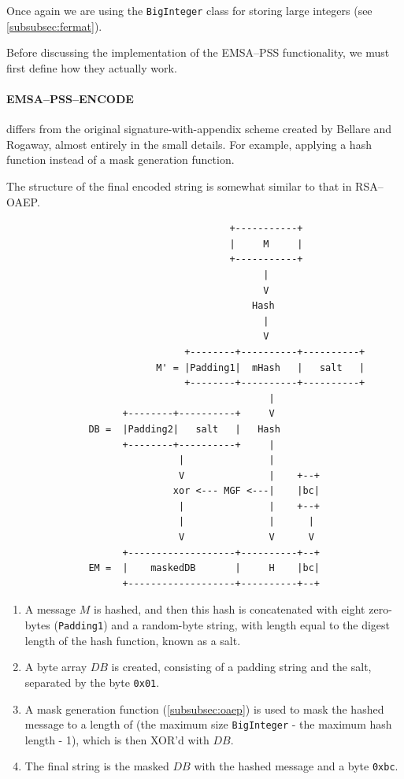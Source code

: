     Once again we are using the \verb!BigInteger! class for storing large integers (see \textsection\ref{subsubsec:fermat}).
    
    Before discussing the implementation of the EMSA--PSS functionality, we must first define how they actually work.
    
    \paragraph{EMSA--PSS--ENCODE} differs from the original signature-with-appendix scheme created by Bellare and Rogaway, almost entirely in the small details. For example, applying a hash function instead of a mask generation function. 
    
    The structure of the final encoded string is somewhat similar to that in RSA--OAEP. \\
    
    \begin{figure}
\begin{lstlisting}
                                  +-----------+
                                  |     M     |
                                  +-----------+
                                        |
                                        V
                                      Hash
                                        |
                                        V
                          +--------+----------+----------+
                     M' = |Padding1|  mHash   |   salt   |
                          +--------+----------+----------+
                                         |
               +--------+----------+     V
         DB =  |Padding2|   salt   |   Hash
               +--------+----------+     |
                         |               |
                         V               |    +--+
                        xor <--- MGF <---|    |bc|
                         |               |    +--+
                         |               |      |
                         V               V      V
               +-------------------+----------+--+
         EM =  |    maskedDB       |     H    |bc|
               +-------------------+----------+--+
\end{lstlisting}
    \end{figure}

    \begin{enumerate}
      \item A message $M$ is hashed, and then this hash is concatenated with eight zero-bytes (\verb!Padding1!) and a random-byte string, with length equal to the digest length of the hash function, known as a salt.
      \item A byte array $DB$ is created, consisting of a padding string and the salt, separated by the byte \verb!0x01!.
      \item A mask generation function (\textsection\ref{subsubsec:oaep}) is used to mask the hashed message to a length of (the maximum size \verb!BigInteger! - the maximum hash length - 1), which is then XOR'd with $DB$.
      \item The final string is the masked $DB$ with the hashed message and a byte \verb!0xbc!.
    \end{enumerate}


